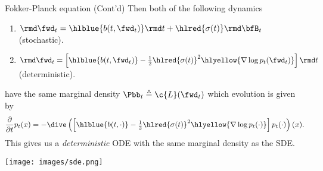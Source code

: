 \begin{frame}{Fokker-Planck equation (Cont'd)}
Then both of the following dynamics
\begin{enumerate}
    \item $\rmd \fwd_t = \hlblue{b(t, \fwd_t)} \rmd t + \hlred{\sigma(t)} \rmd \bfB_t$ (stochastic).
    \item $\rmd \fwd_t = \left[ \hlblue{b(t, \fwd_t)} - \tfrac{1}{2} \hlred{\sigma(t)}^2 \hlyellow{\nabla \log p_t(\fwd_t)} \right] \rmd t$ (deterministic).
\end{enumerate}
have the same marginal density $\Pbb_t\triangleq\c{L}(\fwd_t)$ which evolution is given by
\begin{equation*}
    \frac{\partial}{\partial t} p_t(x) = -\dive\left( \left[ \hlblue{b(t, \cdot)} - \tfrac{1}{2}\hlred{\sigma(t)}^2 \hlyellow{\nabla \log p_t(\cdot)} \right] p_t(\cdot) \right) (x).
\end{equation*}
This gives us a \textit{deterministic} ODE with the same marginal density as the SDE.
%
\begin{center}
    \texttt{[image: images/sde.png]}
\end{center}
%
\end{frame}

